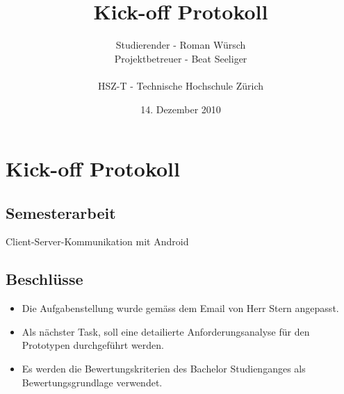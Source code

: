 \documentclass[listof=totoc,bibliography=totoc]{scrreprt}
\title{Kick-off Protokoll}
\author{Studierender - Roman Würsch\\
    Projektbetreuer - Beat Seeliger\\
    \\
    HSZ-T - Technische Hochschule Zürich}
\date{14. Dezember 2010}
\begin{document}
    \ifpdf
    \else
    \fi

    \maketitle



    \chapter{Kick-off Protokoll}

    \section{Semesterarbeit}
    Client-Server-Kommunikation mit Android

    \section{Beschlüsse}
    \begin{itemize}
        \item Die Aufgabenstellung wurde gemäss dem Email von Herr Stern
            angepasst.
        \item Als nächster Task, soll eine detailierte Anforderungsanalyse für
            den Prototypen durchgeführt werden.
        \item Es werden die Bewertungskriterien des Bachelor Studienganges als
            Bewertungsgrundlage verwendet.
    \end{itemize}
    
\end{document}
